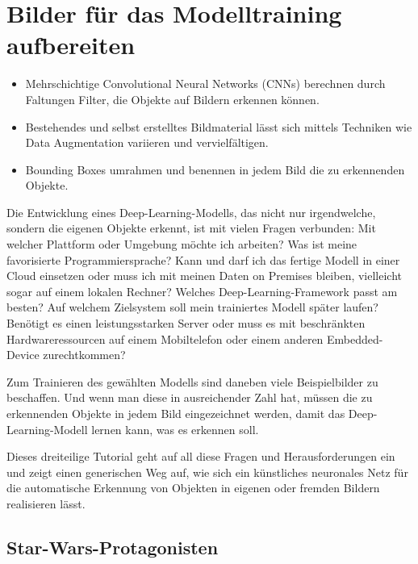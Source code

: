 %
%


\chapter{Bilder für das Modelltraining aufbereiten}

\begin{itemize}
	\item Mehrschichtige Convolutional Neural Networks (CNNs) berechnen durch Faltungen Filter, die Objekte auf Bildern erkennen können.  
	\item Bestehendes und selbst erstelltes Bildmaterial lässt sich mittels Techniken wie Data Augmentation variieren und vervielfältigen. 
	\item Bounding Boxes umrahmen und benennen in jedem Bild die zu erkennenden Objekte. 
\end{itemize}


Die Entwicklung eines Deep-Learning-Modells, das nicht nur irgendwelche, sondern die eigenen Objekte erkennt, ist mit vielen Fragen verbunden: Mit welcher Plattform oder Umgebung möchte ich arbeiten? Was ist meine favorisierte Programmiersprache? Kann und darf ich das fertige Modell in einer Cloud einsetzen oder muss ich mit meinen Daten on Premises bleiben, vielleicht sogar auf einem lokalen Rechner? Welches Deep-­Learning-Framework passt am besten? Auf welchem Zielsystem soll mein trainiertes Modell später laufen? Benötigt es einen leistungsstarken Server oder muss es mit beschränkten Hardwareressourcen auf einem Mobiltelefon oder einem anderen Embedded-Device zurechtkommen? 

Zum Trainieren des gewählten Modells sind daneben viele Beispielbilder zu beschaffen. Und wenn man diese in ausreichender Zahl hat, müssen die zu erkennenden Objekte in jedem Bild eingezeichnet werden, damit das Deep-Learning-Modell lernen kann, was es erkennen soll. 

Dieses dreiteilige Tutorial geht auf all diese Fragen und Herausforderungen ein und zeigt einen generischen Weg auf, wie sich ein künstliches neuronales Netz für die automatische Erkennung von Objekten in eigenen oder fremden Bildern realisieren lässt. 


\section{Star-Wars-Protagonisten}

